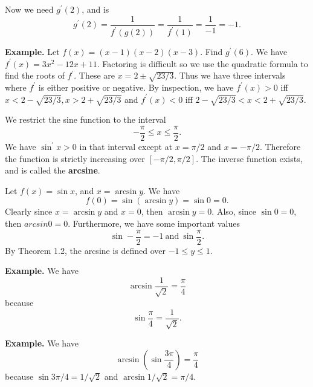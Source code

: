       Now we need $g^\prime(2)$, and is
      \[g^\prime(2) = \frac{1}{f^\prime(g(2))} = \frac{1}{f^\prime(1)} = \frac{1}{-1} = -1.\]
      
      \textbf{Example.} Let $f(x) = (x-1)(x-2)(x-3)$. Find $g^\prime(6)$. We have $f^\prime(x) = 3x^2 - 12x + 11$. Factoring is difficult so we use the quadratic formula to find the roots of $f^\prime$. These are $x = 2 \pm \sqrt{23/3}$. Thus we have three intervals where $f^\prime$ is either positive or negative. By inspection, we have $f^\prime(x) > 0$ iff $x < 2 - \sqrt{23/3}, x > 2 + \sqrt{23/3}$ and $f^\prime(x) < 0$ iff $2 - \sqrt{23/3} < x < 2 + \sqrt{23/3}$.

      We restrict the sine function to the interval
      \[-\frac{\pi}{2} \le x \le \frac{\pi}{2}.\]
      We have $\sin^\prime x > 0$ in that interval except at $x = \pi/2$ and $x = -\pi/2$. Therefore the function is strictly increasing over $[-\pi/2, \pi/2]$. The inverse function exists, and is called the \textbf{arcsine}.

      Let $f(x) = \sin x$, and $x = \arcsin y$. We have
      \[f(0) = \sin(\arcsin y) = \sin 0 = 0.\]
      Clearly since $x = \arcsin y$ and $x = 0$, then $\arcsin y = 0$. Also, since $\sin 0 = 0$, then $arcsin 0 = 0$. Furthermore, we have some important values
      \[\sin -\frac{\pi}{2} = -1\: \text{and}\: \sin \frac{\pi}{2}.\]
      By Theorem 1.2, the arcsine is defined over $-1 \le y \le 1$.

      \textbf{Example.} We have
      \[\arcsin \frac{1}{\sqrt{2}} = \frac{\pi}{4}\]
      because
      \[\sin \frac{\pi}{4} = \frac{1}{\sqrt{2}}.\]

      \textbf{Example.} We have
      \[\arcsin(\sin \frac{3\pi}{4}) = \frac{\pi}{4}\]
      because $\sin 3\pi/4 = 1/\sqrt{2}$ and $\arcsin 1/\sqrt{2} = \pi/4$.
      
